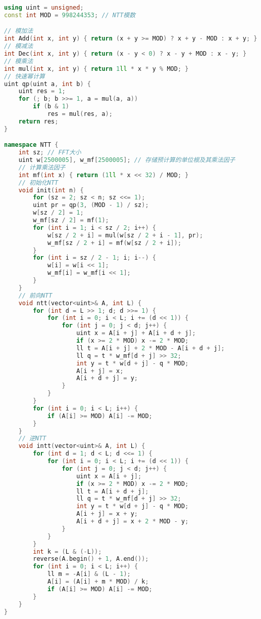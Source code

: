 \begin{lstlisting}[language=C++]
using uint = unsigned;
const int MOD = 998244353; // NTT模数

// 模加法
int Add(int x, int y) { return (x + y >= MOD) ? x + y - MOD : x + y; }
// 模减法
int Dec(int x, int y) { return (x - y < 0) ? x - y + MOD : x - y; }
// 模乘法
int mul(int x, int y) { return 1ll * x * y % MOD; }
// 快速幂计算
uint qp(uint a, int b) { 
    uint res = 1; 
    for (; b; b >>= 1, a = mul(a, a))  
        if (b & 1)  
            res = mul(res, a); 
    return res; 
}

namespace NTT {
    int sz; // FFT大小
    uint w[2500005], w_mf[2500005]; // 存储预计算的单位根及其乘法因子
    // 计算乘法因子
    int mf(int x) { return (1ll * x << 32) / MOD; }
    // 初始化NTT
    void init(int n) {
        for (sz = 2; sz < n; sz <<= 1);
        uint pr = qp(3, (MOD - 1) / sz);
        w[sz / 2] = 1; 
        w_mf[sz / 2] = mf(1);
        for (int i = 1; i < sz / 2; i++) {
            w[sz / 2 + i] = mul(w[sz / 2 + i - 1], pr);
            w_mf[sz / 2 + i] = mf(w[sz / 2 + i]);
        }
        for (int i = sz / 2 - 1; i; i--) {
            w[i] = w[i << 1];
            w_mf[i] = w_mf[i << 1];
        }
    }
    // 前向NTT
    void ntt(vector<uint>& A, int L) {
        for (int d = L >> 1; d; d >>= 1) {
            for (int i = 0; i < L; i += (d << 1)) {
                for (int j = 0; j < d; j++) {
                    uint x = A[i + j] + A[i + d + j];
                    if (x >= 2 * MOD) x -= 2 * MOD;
                    ll t = A[i + j] + 2 * MOD - A[i + d + j];
                    ll q = t * w_mf[d + j] >> 32; 
                    int y = t * w[d + j] - q * MOD;
                    A[i + j] = x; 
                    A[i + d + j] = y;
                }
            }
        }
        for (int i = 0; i < L; i++) {
            if (A[i] >= MOD) A[i] -= MOD;
        }
    }
    // 逆NTT
    void intt(vector<uint>& A, int L) {
        for (int d = 1; d < L; d <<= 1) {
            for (int i = 0; i < L; i += (d << 1)) {
                for (int j = 0; j < d; j++) {
                    uint x = A[i + j]; 
                    if (x >= 2 * MOD) x -= 2 * MOD;
                    ll t = A[i + d + j];
                    ll q = t * w_mf[d + j] >> 32;
                    int y = t * w[d + j] - q * MOD;
                    A[i + j] = x + y; 
                    A[i + d + j] = x + 2 * MOD - y;
                }
            }
        }
        int k = (L & (-L));
        reverse(A.begin() + 1, A.end());
        for (int i = 0; i < L; i++) {
            ll m = -A[i] & (L - 1);
            A[i] = (A[i] + m * MOD) / k;
            if (A[i] >= MOD) A[i] -= MOD;
        }
    }
}


\end{lstlisting}
